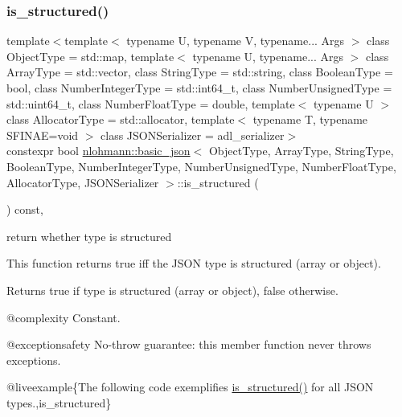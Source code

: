 \subsubsection{\texorpdfstring{is\_structured()}{is\_structured()}}
{\footnotesize\ttfamily template$<$template$<$ typename U, typename V, typename... Args $>$ class Object\+Type = std\+::map, template$<$ typename U, typename... Args $>$ class Array\+Type = std\+::vector, class String\+Type  = std\+::string, class Boolean\+Type  = bool, class Number\+Integer\+Type  = std\+::int64\+\_\+t, class Number\+Unsigned\+Type  = std\+::uint64\+\_\+t, class Number\+Float\+Type  = double, template$<$ typename U $>$ class Allocator\+Type = std\+::allocator, template$<$ typename T, typename S\+F\+I\+N\+A\+E=void $>$ class J\+S\+O\+N\+Serializer = adl\+\_\+serializer$>$ \\
constexpr bool \mbox{\hyperlink{classnlohmann_1_1basic__json}{nlohmann\+::basic\+\_\+json}}$<$ Object\+Type, Array\+Type, String\+Type, Boolean\+Type, Number\+Integer\+Type, Number\+Unsigned\+Type, Number\+Float\+Type, Allocator\+Type, J\+S\+O\+N\+Serializer $>$\+::is\+\_\+structured (\begin{DoxyParamCaption}{ }\end{DoxyParamCaption}) const\hspace{0.3cm}{\ttfamily [inline]}, {\ttfamily [noexcept]}}



return whether type is structured 

This function returns true iff the J\+S\+ON type is structured (array or object).

\begin{DoxyReturn}{Returns}
{\ttfamily true} if type is structured (array or object), {\ttfamily false} otherwise.
\end{DoxyReturn}
@complexity Constant.

@exceptionsafety No-\/throw guarantee\+: this member function never throws exceptions.

@liveexample\{The following code exemplifies {\ttfamily \mbox{\hyperlink{classnlohmann_1_1basic__json_a9f68a0af820c3ced7f9d17851ce4c22d}{is\+\_\+structured()}}} for all J\+S\+ON types.,is\+\_\+structured\}

